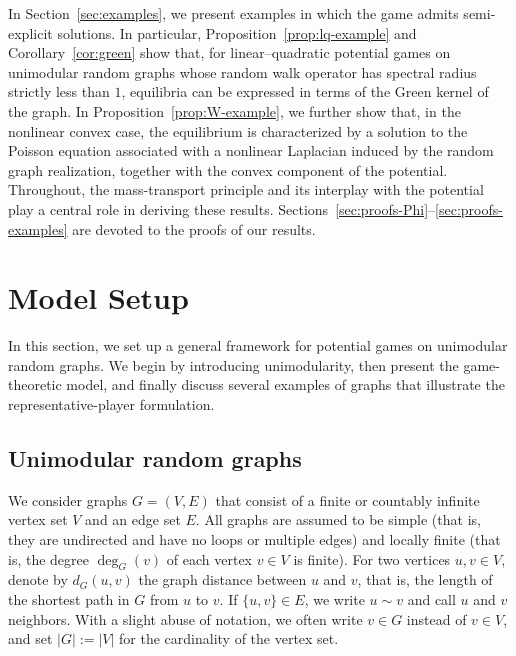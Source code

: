 \documentclass[11pt]{article}
\numberwithin{equation}{section}
\begin{document}
In Section~\ref{sec:examples}, we present examples in which the game admits semi-explicit solutions. In particular, Proposition~\ref{prop:lq-example} and Corollary~\ref{cor:green} show that, for linear–quadratic potential games on unimodular random graphs whose random walk operator has spectral radius strictly less than $1$, equilibria can be expressed in terms of the Green kernel of the graph. In Proposition~\ref{prop:W-example}, we further show that, in the nonlinear convex case, the equilibrium is characterized by a solution to the Poisson equation associated with a nonlinear Laplacian induced by the random graph realization, together with the convex component of the potential. Throughout, the mass-transport principle and its interplay with the potential play a central role in deriving these results. Sections~\ref{sec:proofs-Phi}--\ref{sec:proofs-examples} are devoted to the proofs of our results.


\section{Model Setup} \label{sec:model}

In this section, we set up a general framework for potential games on unimodular random graphs. We begin by introducing unimodularity, then present the game-theoretic model, and finally discuss several examples of graphs that illustrate the representative-player formulation.

\subsection{Unimodular random graphs}

We consider graphs $G=(V,E)$ that consist of a finite or countably infinite vertex set $V$ and an edge set $E$. All graphs are assumed to be simple (that is, they are undirected and have no loops or multiple edges) and locally finite (that is, the degree $\deg_G(v)$ of each vertex $v\in V$ is finite). For two vertices $u,v\in V$, denote by $d_G(u,v)$ the graph distance between $u$ and $v$, that is, the length of the shortest path in $G$ from $u$ to $v$. If $\{u,v\}\in E$, we write $u\sim v$ and call $u$ and $v$ neighbors. With a slight abuse of notation, we often write $v\in G$ instead of $v\in V$, and set $|G|:=|V|$ for the cardinality of the vertex set.
\end{document}
